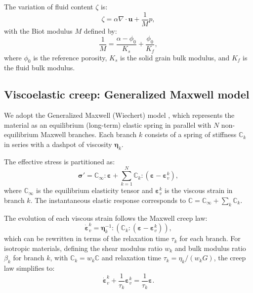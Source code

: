 \documentclass[a4paper,fleqn,longmktitle]{cas-sc}
\begin{document}
The variation of fluid content $\zeta$ is:
\begin{equation}
\zeta = \alpha \nabla\cdot\bm{u} + \frac{1}{M} p,
\label{eq:fluid_content}
\end{equation}
with the Biot modulus $M$ defined by:
\begin{equation}
\frac{1}{M} = \frac{\alpha - \phi_0}{K_s} + \frac{\phi_0}{K_f},
\label{eq:biot_modulus}
\end{equation}
where $\phi_0$ is the reference porosity, $K_s$ is the solid grain bulk modulus,
and $K_f$ is the fluid bulk modulus.

\subsection{Viscoelastic creep: Generalized Maxwell model}

We adopt the Generalized Maxwell (Wiechert) model \citep{Christensen1982}, which
represents the material as an equilibrium (long-term) elastic spring in parallel
with $N$ non-equilibrium Maxwell branches. Each branch $k$ consists of a spring
of stiffness $\mathbb{C}_k$ in series with a dashpot of viscosity $\bm{\eta}_k$.

The effective stress is partitioned as:
\begin{equation}
\bm{\sigma}' = \mathbb{C}_\infty : \bm{\varepsilon} +
\sum_{k=1}^{N} \mathbb{C}_k : (\bm{\varepsilon} - \bm{\varepsilon}_v^k),
\label{eq:generalized_maxwell_stress}
\end{equation}
where $\mathbb{C}_\infty$ is the equilibrium elasticity tensor and
$\bm{\varepsilon}_v^k$ is the viscous strain in branch $k$. The instantaneous
elastic response corresponds to $\mathbb{C} = \mathbb{C}_\infty + \sum_k
\mathbb{C}_k$.

The evolution of each viscous strain follows the Maxwell creep law:
\begin{equation}
\dot{\bm{\varepsilon}}_v^k = \bm{\eta}_k^{-1} :
(\mathbb{C}_k : (\bm{\varepsilon} - \bm{\varepsilon}_v^k)),
\label{eq:creep_law}
\end{equation}
which can be rewritten in terms of the relaxation time $\tau_k$ for each
branch. For isotropic materials, defining the shear modulus ratio $w_k$ and
bulk modulus ratio $\beta_k$ for branch $k$, with $\mathbb{C}_k = w_k
\mathbb{C}$ and relaxation time $\tau_k = \eta_k / (w_k G)$, the creep law
simplifies to:
\begin{equation}
\dot{\bm{\varepsilon}}_v^k + \frac{1}{\tau_k} \bm{\varepsilon}_v^k =
\frac{1}{\tau_k} \bm{\varepsilon}.
\label{eq:creep_isotropic}
\end{equation}
\end{document}
